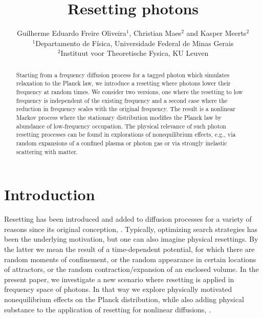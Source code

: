 \documentclass[a4paper,12pt,reqno,superscriptaddress,nofootinbib]{revtex4}
\theoremstyle{plain}
\theoremstyle{definition}
\theoremstyle{remark}
\newcommand{\0}{^{(0)}}
\newcommand{\1}{^{(1)}}
\newcommand{\2}{^{(2)}}
\begin{document}
	\title{Resetting photons}	
	\author{Guilherme Eduardo Freire Oliveira$^1$, Christian Maes$^2$ and Kasper Meerts$^{2}$\\ $^1$Departamento de Física, Universidade Federal de Minas Gerais \\ $^2$Instituut voor Theoretische Fysica, KU Leuven}

\begin{abstract}
Starting from a frequency diffusion process for a tagged photon which simulates relaxation to the Planck law, we introduce a resetting where photons lower their frequency at random times.
We consider two versions, one where the resetting to low frequency is independent of the existing frequency and a second case where the reduction in frequency scales with the original frequency.  The result is a nonlinear Markov process where the stationary distribution modifies the Planck law by abundance of low-frequency occupation. The physical relevance of such photon resetting processes can be found in explorations of nonequilibrium effects, e.g., via random expansions of a confined plasma or photon gas or via strongly inelastic scattering with matter.
\end{abstract}
\maketitle

\section{Introduction}
Resetting has been introduced and added to diffusion processes for a variety of reasons since its original conception, \cite{tong1,evans1,evans2,evans3}.  Typically, optimizing search strategies has been the underlying motivation, but one can also imagine physical resettings.  By the latter we mean the result of a time-dependent potential, for which there are random moments of confinement, or the random appearance in certain locations of attractors, or the random contraction/expansion of an enclosed volume.  In the present paper, we investigate a new scenario where resetting is applied in frequency space of photons.  In that way we explore physically motivated nonequilibrium effects on the Planck distribution, while also adding physical substance to the application of resetting for nonlinear diffusions, \cite{przem}.\\
\end{document}
